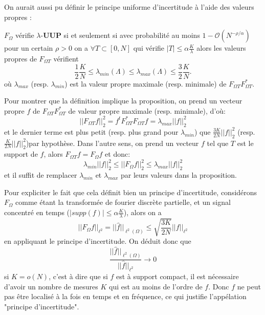On aurait aussi pu définir le principe uniforme d'incertitude à l'aide des valeurs propres :
\begin{proposition}\label{th:lambdauup}
	$F_\Omega$ vérifie $\lambda$-\textbf{UUP} si et seulement si 
	\newline
	avec probabilité au moins $1-\mathcal{O}(N^{-\rho / \alpha})$ pour un certain $\rho>0$ on a
	$\forall T \subset [0, N]$ qui vérifie $|T| \leq \alpha \frac{K}{\lambda}$ alors les valeurs propres de $F_{\Omega T}$ vérifient
	\begin{equation*}
		\frac{1}{2} \frac{K}{N} \leq \lambda_{min}(\Lambda) \leq \lambda_{max}(\Lambda) \leq \frac{3}{2}\frac{K}{N}.
	\end{equation*}
	où $\lambda_{max}$ (resp. $\lambda_{min}$) est la valeur propre maximale (resp. minimale) de $F_{\Omega T} F_{\Omega T}^*$. 
\end{proposition}
\begin{preuve}
	Pour montrer que la définition implique la proposition, on prend un vecteur propre $f$ de $F_{\Omega T}F_{\Omega T}^*$ de valeur propre maximale (resp. minimale), d'où:
	\begin{equation}
		||F_{\Omega T} f||_2^2 = f^t F_{\Omega T}^*F_{\Omega T} f = \lambda_{max} ||f||_2^2 
	\end{equation}
	et le dernier terme est plus petit (resp. plus grand pour $\lambda_{min}$) que $\frac{3K}{2N}||f||_2^2$  (resp. $\frac{K}{2N}||f||_2^2$)par hypothèse.
	\newline
	Dans l'autre sens, on prend un vecteur $f$ tel que $T$ est le support de $f$, alors $F_{\Omega T} f = F_\Omega f$ et donc:
	\begin{equation}
		\lambda_{min} ||f||_2^2 \leq ||F_\Omega f||_2^2 \leq \lambda_{max} ||f||_2^2
	\end{equation}
	et il suffit de remplacer $\lambda_{min}$ et $\lambda_{max}$ par leurs valeurs dans la proposition.
\end{preuve}
\begin{remarque}
	Pour expliciter le fait que cela définit bien un principe d'incertitude, considérons $F_\Omega$ comme étant la transformée de fourier discrète partielle, et un signal concentré en temps ($|supp(f)| \leq \alpha \frac{K}{\lambda}$), alors on a 
	\begin{equation}
		||F_\Omega f||_{\ell^2} = ||\hat{f}||_{\ell^2(\Omega)} \leq \sqrt{\frac{3 K}{2N}}||f||_{\ell^2}
	\end{equation}
	en appliquant le principe d'incertitude.
	On déduit donc que 
	\begin{equation}
		\frac{ ||\hat{f}||_{\ell^2(\Omega)}}{||\hat{f}||_{\ell^2}} \longrightarrow 0
	\end{equation}
	si $K=o(N)$, c'est à dire que si $f$ est à support compact, il est nécessaire d'avoir un nombre de mesures $K$ qui est au moins de l'ordre de $f$.
	Donc $f$ ne peut pas être localisé à la fois en temps et en fréquence, ce qui justifie l'appélation "principe d'incertitude". 
\end{remarque}
